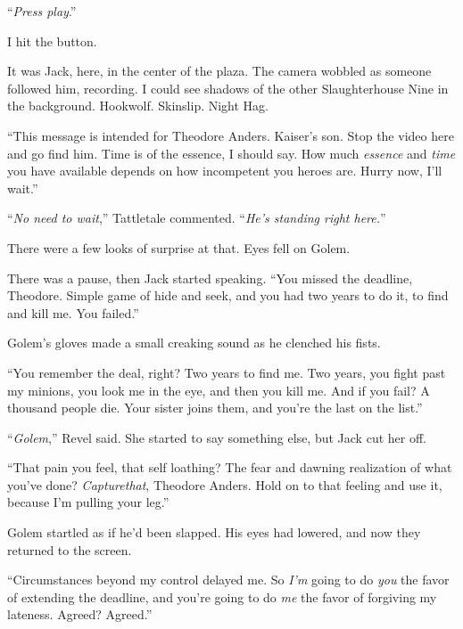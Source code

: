 ``\emph{Press play}.''



I hit the button.



It was Jack, here, in the center of the plaza.  The camera wobbled as someone followed him, recording.  I could see shadows of the other Slaughterhouse Nine in the background.  Hookwolf.  Skinslip.  Night Hag.



``This message is intended for Theodore Anders.  Kaiser's son.  Stop the video here and go find him.  Time is of the essence, I should say.  How much \emph{essence} and \emph{time} you have available depends on how incompetent you heroes are.  Hurry now, I'll wait.''



``\emph{No need to wait},'' Tattletale commented.  ``\emph{He's standing right here.}''



There were a few looks of surprise at that.  Eyes fell on Golem.



There was a pause, then Jack started speaking.  ``You missed the deadline, Theodore.  Simple game of hide and seek, and you had two years to do it, to find and kill me.  You failed.''



Golem's gloves made a small creaking sound as he clenched his fists.



``You remember the deal, right?  Two years to find me.  Two years, you fight past my minions, you look me in the eye, and then you kill me.  And if you fail?  A thousand people die.  Your sister joins them, and you're the last on the list.''



``\emph{Golem},'' Revel said.  She started to say something else, but Jack cut her off.



``That pain you feel, that self loathing?  The fear and dawning realization of what you've done?  \emph{Capture}\emph{that}, Theodore Anders.  Hold on to that feeling and use it, because I'm pulling your leg.''



Golem startled as if he'd been slapped.  His eyes had lowered, and now they returned to the screen.



``Circumstances beyond my control delayed me.  So \emph{I'm} going to do \emph{you} the favor of extending the deadline, and you're going to do \emph{me} the favor of forgiving my lateness.  Agreed?  Agreed.''



